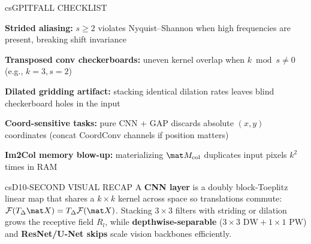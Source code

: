\documentclass[../../../../master.tex]{subfiles}
\begin{document}
\begin{cscolumns}
\begin{cscard}{csG}{PITFALL CHECKLIST}
  \begin{csbul}
    \item \textbf{Strided aliasing:} $s\ge 2$ violates Nyquist--Shannon when high frequencies are present, breaking shift invariance
    \item \textbf{Transposed conv checkerboards:} uneven kernel overlap when $k\bmod s\neq 0$ (e.g., $k=3, s=2$)
    \item \textbf{Dilated gridding artifact:} stacking identical dilation rates leaves blind checkerboard holes in the input
    \item \textbf{Coord-sensitive tasks:} pure CNN + GAP discards absolute $(x,y)$ coordinates (concat CoordConv channels if position matters)
    \item \textbf{Im2Col memory blow-up:} materializing $\mat M_{\mathrm{col}}$ duplicates input pixels $k^2$ times in RAM
  \end{csbul}
\end{cscard}

\begin{cscard}{csD}{10-SECOND VISUAL RECAP}
  \sffamily\footnotesize
  A \textbf{CNN layer} is a doubly block-Toeplitz linear map that shares a $k\times k$ kernel across space so translations commute: $\mathcal{F}(T_\Delta\mat X)=T_\Delta\mathcal{F}(\mat X)$.
  Stacking $3\times 3$ filters with striding or dilation grows the receptive field $R_l$, while \textbf{depthwise-separable} ($3\times 3\text{ DW}+1\times 1\text{ PW}$) and \textbf{ResNet/U-Net skips} scale vision backbones efficiently.
\end{cscard}
\end{cscolumns}

\csend
\end{document}
